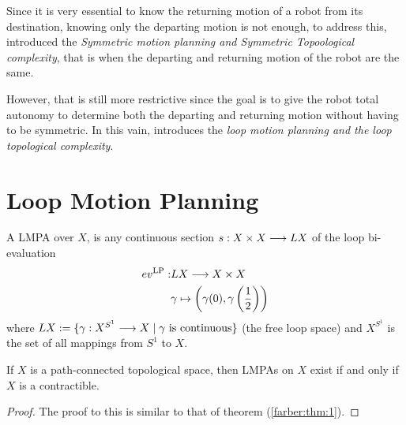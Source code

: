 Since it is very essential to know the returning motion of a robot from its destination, knowing only the departing motion is not enough, to address this, \cite{farber2007symmetric} introduced the \emph{Symmetric motion planning and Symmetric Topoological complexity}, that is when the departing and returning motion of the robot are the same.

However, that is still more restrictive since the goal is to give the robot total autonomy to determine both the departing and returning motion without having to be symmetric. In this vain, \cite{derfoufi2015loop} introduces the \emph{loop motion planning and the loop topological complexity}.



\section{Loop Motion Planning}
\begin{defn}
    A LMPA over $X$, is any continuous section $s: X \times X \longrightarrow LX$ of the loop bi-evaluation
    \begin{align*}
        ev^{\mathrm{LP}} : & LX \longrightarrow X \times X                                                  \\
                           & \gamma \mapsto \left(\gamma(0), \gamma \left(\frac12\right) \right)
    \end{align*}
    where $LX := \{\gamma : X ^{S^1} \longrightarrow X \mid \gamma \text{ is continuous}\}$ (the free loop space) and $X^{S^1}$ is the set of all mappings from $S^1$ to $X$.
\end{defn}

\begin{thm}\cite{derfoufi2015loop}
    If $X$ is a path-connected topological space, then LMPAs on $X$ exist if and only if $X$ is a contractible.
\end{thm}

\begin{proof}
    The proof to this is similar to that of theorem (\ref{farber:thm:1}).
\end{proof}

